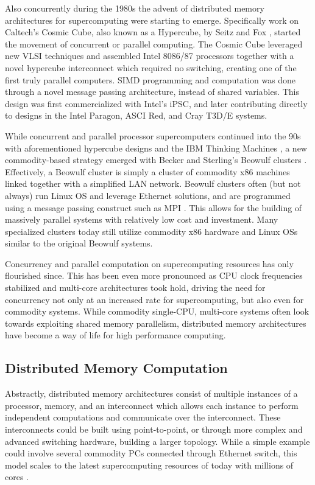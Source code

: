 Also concurrently during the 1980s the advent of distributed memory architectures for supercomputing were starting to emerge. Specifically work on Caltech's Cosmic Cube, also known as a Hypercube, by Seitz and Fox \cite{seitz1985cosmic, fox1987matrix}, started the movement of concurrent or parallel computing.  The Cosmic Cube leveraged new VLSI techniques and assembled Intel 8086/87 processors together with a novel hypercube interconnect which required no switching, creating one of the first truly parallel computers. SIMD programming and computation was done through a novel message passing architecture, instead of shared variables.  This design was first commercialized with Intel's iPSC, and later contributing directly to designs in the Intel Paragon, ASCI Red, and Cray T3D/E systems.  

While concurrent and parallel processor supercomputers continued into the 90s with aforementioned hypercube designs and the IBM Thinking Machines \cite{cm1}, a new commodity-based strategy emerged with Becker and Sterling's Beowulf clusters \cite{sterling2001beowulf}. Effectively, a Beowulf cluster is simply a cluster of commodity x86 machines linked together with a simplified LAN network. Beowulf clusters often (but not always) run Linux OS and leverage Ethernet solutions, and are programmed using a message passing construct such as MPI \cite{mpi}. This allows for the building of massively parallel systems with relatively low cost and investment. Many specialized clusters today still utilize commodity x86 hardware and Linux OSs similar to the original Beowulf systems.   

Concurrency and parallel computation on supercomputing resources has only flourished since. This has been even more pronounced as CPU clock frequencies stabilized and multi-core architectures took hold, driving the need for concurrency not only at an increased rate for supercomputing, but also even for commodity systems.   While commodity single-CPU, multi-core systems often look towards exploiting shared memory parallelism, distributed memory architectures have become a way of life for high performance computing. 

\subsection{Distributed Memory Computation}

Abstractly,  distributed memory architectures consist of multiple instances of a processor, memory, and an interconnect which allows each instance to perform independent computations and communicate over the interconnect. These interconnects could be built using point-to-point, or through more complex and advanced switching hardware, building a larger topology.  While a simple example could involve several commodity PCs connected through Ethernet switch, this model scales to the latest supercomputing resources of today with millions of cores \cite{zhang2014optimizing}.  

